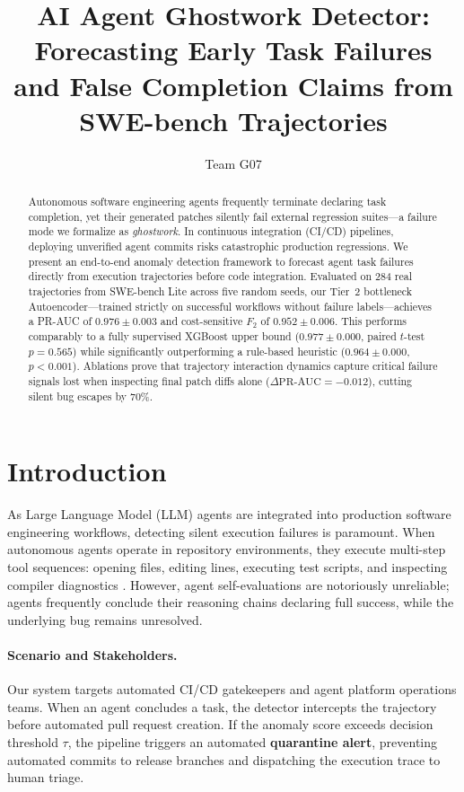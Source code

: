 \documentclass[11pt]{article}
\title{\textbf{AI Agent Ghostwork Detector: Forecasting Early Task Failures and False Completion Claims from SWE-bench Trajectories}}
\author{Team G07}
\begin{document}
\maketitle

\begin{abstract}
Autonomous software engineering agents frequently terminate declaring task completion, yet their generated patches silently fail external regression suites---a failure mode we formalize as \textit{ghostwork}. In continuous integration (CI/CD) pipelines, deploying unverified agent commits risks catastrophic production regressions. We present an end-to-end anomaly detection framework to forecast agent task failures directly from execution trajectories before code integration. Evaluated on 284 real trajectories from SWE-bench Lite across five random seeds, our Tier~2 bottleneck Autoencoder---trained strictly on successful workflows without failure labels---achieves a PR-AUC of $0.976 \pm 0.003$ and cost-sensitive $F_2$ of $0.952 \pm 0.006$. This performs comparably to a fully supervised XGBoost upper bound ($0.977 \pm 0.000$, paired $t$-test $p=0.565$) while significantly outperforming a rule-based heuristic ($0.964 \pm 0.000$, $p<0.001$). Ablations prove that trajectory interaction dynamics capture critical failure signals lost when inspecting final patch diffs alone ($\Delta\text{PR-AUC} = -0.012$), cutting silent bug escapes by 70\%.
\end{abstract}

\section{Introduction}
As Large Language Model (LLM) agents are integrated into production software engineering workflows, detecting silent execution failures is paramount. When autonomous agents operate in repository environments, they execute multi-step tool sequences: opening files, editing lines, executing test scripts, and inspecting compiler diagnostics \citep{yang2024sweagent}. However, agent self-evaluations are notoriously unreliable; agents frequently conclude their reasoning chains declaring full success, while the underlying bug remains unresolved.

\paragraph{Scenario and Stakeholders.}
Our system targets automated CI/CD gatekeepers and agent platform operations teams. When an agent concludes a task, the detector intercepts the trajectory before automated pull request creation. If the anomaly score exceeds decision threshold $\tau$, the pipeline triggers an automated \textbf{quarantine alert}, preventing automated commits to release branches and dispatching the execution trace to human triage.
\end{document}
